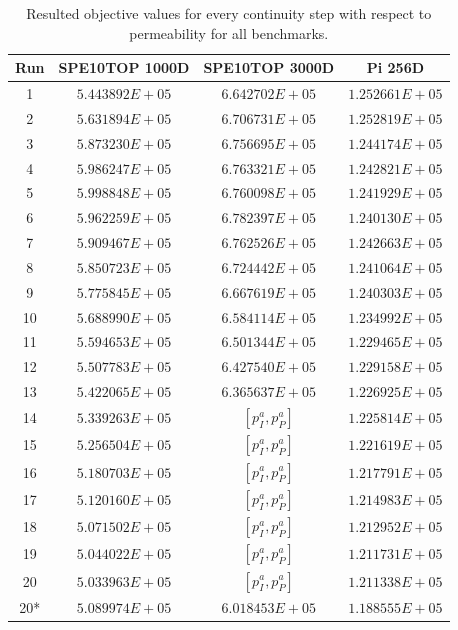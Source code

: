 \begin{table}
\centering
\caption{Resulted objective values for every continuity step with respect to permeability 
for all benchmarks.}
\begin{tabular}{cccc}
\toprule
Run & SPE10TOP 1000D & SPE10TOP 3000D & Pi 256D   \\[2pt]
\midrule
1 & $5.443892E+05$ & $6.642702E+05$ & $1.252661E+05$  \\
2 & $5.631894E+05$ & $6.706731E+05$ & $1.252819E+05$ \\
3 & $5.873230E+05$  & $6.756695E+05$    & $1.244174E+05$ \\
4 & $5.986247E+05$ & $6.763321E+05$   & $1.242821E+05$ \\
5 & $5.998848E+05$  & $6.760098E+05$   & $1.241929E+05$  \\
6 & $5.962259E+05$  & $6.782397E+05$   & $1.240130E+05$   \\
7 & $5.909467E+05$  & $6.762526E+05$   & $1.242663E+05$  \\
8 & $5.850723E+05$  & $6.724442E+05$   & $1.241064E+05$  \\
9 & $5.775845E+05$  & $6.667619E+05$   & $1.240303E+05$  \\
10 & $5.688990E+05$  & $6.584114E+05$   & $1.234992E+05$   \\
11 & $5.594653E+05$  & $6.501344E+05$   & $1.229465E+05$  \\
12 & $5.507783E+05$  & $6.427540E+05$   & $1.229158E+05$  \\
13 & $5.422065E+05$  & $6.365637E+05$   & $1.226925E+05$  \\
14 & $5.339263E+05$  & $[p_I^a, p_P^a]$   & $1.225814E+05$   \\
15 & $5.256504E+05$  & $[p_I^a, p_P^a]$   & $1.221619E+05$  \\
16 & $5.180703E+05$  & $[p_I^a, p_P^a]$   & $1.217791E+05$  \\
17 & $5.120160E+05$  & $[p_I^a, p_P^a]$   & $1.214983E+05$   \\
18 & $5.071502E+05$  & $[p_I^a, p_P^a]$   & $1.212952E+05$  \\
19 & $5.044022E+05$  & $[p_I^a, p_P^a]$   & $1.211731E+05$  \\
20 & $5.033963E+05$  & $[p_I^a, p_P^a]$   & $1.211338E+05$  \\[2pt]
20* & $5.089974E+05$  & $6.018453E+05$   & $1.188555E+05$  \\[2pt]
\bottomrule
\end{tabular}
  \label{table:InitialGuesses}
\end{table}

